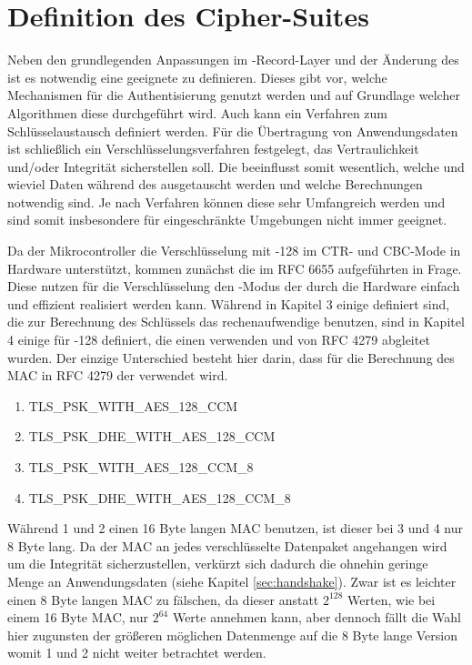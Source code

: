 \chapter{Definition des Cipher-Suites}
\label{chp:ciphercuite}

Neben den grundlegenden Anpassungen im -Record-Layer und der Änderung des  ist es notwendig eine geeignete  zu definieren.
Dieses gibt vor, welche Mechanismen für die Authentisierung genutzt werden und auf Grundlage welcher Algorithmen diese durchgeführt wird. Auch kann
ein Verfahren zum Schlüsselaustausch definiert werden. Für die Übertragung von Anwendungsdaten ist schließlich ein Verschlüsselungsverfahren festgelegt,
das Vertraulichkeit und/oder Integrität sicherstellen soll. Die  beeinflusst somit wesentlich, welche und wieviel Daten während des 
ausgetauscht werden und welche Berechnungen notwendig sind. Je nach Verfahren können diese sehr Umfangreich werden und sind somit insbesondere für eingeschränkte
Umgebungen nicht immer geeignet.

Da der Mikrocontroller die Verschlüsselung mit -128 im CTR- und CBC-Mode in Hardware unterstützt, kommen zunächst die im RFC 6655 \cite{rfc6655}
aufgeführten  in Frage. Diese nutzen für die Verschlüsselung den -Modus der durch die Hardware einfach und effizient realisiert werden
kann. Während in Kapitel 3 einige  definiert sind, die zur Berechnung des Schlüssels das rechenaufwendige  benutzen, sind in Kapitel 4
einige  für -128 definiert, die einen  verwenden und von RFC 4279 \cite{rfc4279} abgleitet wurden. Der einzige Unterschied besteht
hier darin, dass für die Berechnung des MAC in RFC 4279 der  verwendet wird.
\begin{enumerate}
  \item TLS\_PSK\_WITH\_AES\_128\_CCM
  \item TLS\_PSK\_DHE\_WITH\_AES\_128\_CCM
  \item TLS\_PSK\_WITH\_AES\_128\_CCM\_8
  \item TLS\_PSK\_DHE\_WITH\_AES\_128\_CCM\_8
\end{enumerate}
Während 1 und 2 einen 16 Byte langen MAC benutzen, ist dieser bei 3 und 4 nur 8 Byte lang. Da der MAC an jedes verschlüsselte Datenpaket angehangen wird um die
Integrität sicherzustellen, verkürzt sich dadurch die ohnehin geringe Menge an Anwendungsdaten (siehe Kapitel \ref{sec:handshake}). Zwar ist es leichter
einen 8 Byte langen MAC zu fälschen, da dieser anstatt $ 2^128 $ Werten, wie bei einem 16 Byte MAC, nur $ 2^64 $ Werte annehmen kann, aber dennoch fällt die
Wahl hier zugunsten der größeren möglichen Datenmenge auf die 8 Byte lange Version womit  1 und 2 nicht weiter betrachtet werden.

